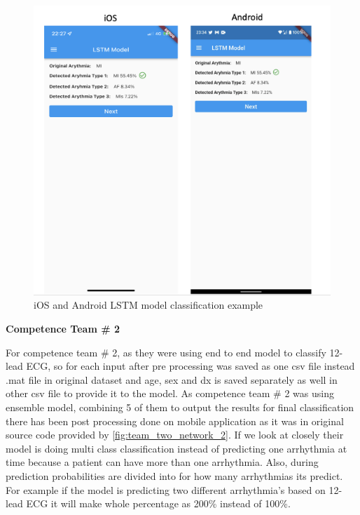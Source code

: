 \begin{figure}[H]
\centering
\includegraphics[scale=0.4]{img/lstm_deployment.png}
\caption{iOS and Android LSTM model classification example}
\label{dnn_deloyment}
\end{figure}

\textbf{Competence Team \# 2}

For competence team \# 2, as they were using end to end model to classify 12-lead ECG, so for each input after pre processing was saved as one csv file instead .mat file in original dataset and age, sex and dx is saved separately as well in other csv file to provide it to the model. As competence team \# 2 was using ensemble model, combining 5 of them to output the results for final classification there has been post processing done on mobile application as it was in original source code provided by \ref{fig:team_two_network_2}. If we look at closely their model is doing multi class classification instead of predicting one arrhythmia at time because a patient can have more than one arrhythmia. Also, during prediction probabilities are divided into for how many arrhythmias its predict. For example if the model is predicting two different arrhythmia's based on 12-lead ECG it will make whole percentage as 200\% instead of 100\%. 

